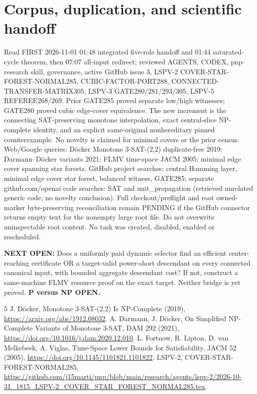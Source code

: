 \documentclass[11pt]{article}
\begin{document}
\section{Corpus, duplication, and scientific handoff}
Read FIRST 2026-11-01 01:48 integrated five-role handoff and 01:44 saturated-cycle theorem, then 07:07 all-input redirect; reviewed AGENTS, CODEX, pnp-research skill, governance, active GitHub issue 3, LSPV-2 COVER-STAR-FOREST-NORMAL285, CUBIC-FACTOR-PORT288, CONNECTED-TRANSFER-MATRIX305, LSPV-3 GATE280/281/293/305, LSPV-5 REFEREE268/269. Prior GATE285 proved separate low/high witnesses; GATE280 proved cubic edge-cover equivalence. The new increment is the connecting SAT-preserving monotone interpolation, exact central-slice NP-complete identity, and an explicit same-original nonhereditary pinned counterexample. No novelty is claimed for minimal covers or the prior census.
Web/Google queries: D\"ocker Monotone 3-SAT-(2,2) duplicate-free 2019; Darmann--D\"ocker variants 2021; FLMV time-space JACM 2005; minimal edge cover spanning star forests. GitHub project searches: central Hamming layer, minimal edge cover star forest, balanced witness, GATE285; separate github.com/openai code searches: SAT and unit_propagation (retrieved unrelated generic code; no novelty conclusion). Full checkout/preflight and root owned-marker byte-preserving reconciliation remain PENDING if the GitHub connector returns empty text for the nonempty large root file. Do not overwrite uninspectable root content. No task was created, disabled, enabled or rescheduled.
\par\noindent \textbf{NEXT OPEN:} Does a uniformly paid dynamic selector find an efficient center-reaching certificate OR a target-valid power-short descendant on every connected canonical input, with bounded aggregate descendant cost? If not, construct a same-machine FLMV resource proof on the exact target. Neither bridge is yet proved. \textbf{P versus NP OPEN.}
\begin{thebibliography}{5}
 J. D\"ocker, Monotone 3-SAT-(2,2) Is NP-Complete (2019), \url{https://arxiv.org/abs/1912.08032}.
 A. Darmann, J. D\"ocker, On Simplified NP-Complete Variants of Monotone 3-SAT, DAM 292 (2021), \url{https://doi.org/10.1016/j.dam.2020.12.010}.
 L. Fortnow, R. Lipton, D. van Melkebeek, A. Viglas, Time-Space Lower Bounds for Satisfiability, JACM 52 (2005), \url{https://doi.org/10.1145/1101821.1101822}.
 LSPV-2, COVER-STAR-FOREST-NORMAL285, \url{https://github.com/j15marti/pnp/blob/main/research/agents/lspv-2/2026-10-31_1815_LSPV-2_COVER_STAR_FOREST_NORMAL285.tex}.
\end{thebibliography}
\end{document}
